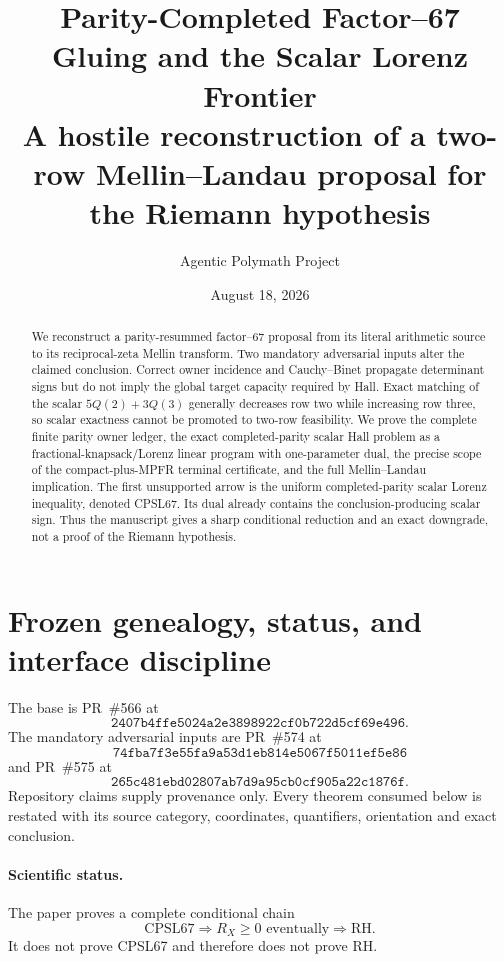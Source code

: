 \documentclass[11pt]{article}
\title{Parity-Completed Factor--67 Gluing and the Scalar Lorenz Frontier\\\large A hostile reconstruction of a two-row Mellin--Landau proposal for the Riemann hypothesis}
\author{Agentic Polymath Project}
\date{August 18, 2026}
\newcommand{\1}{\mathbf 1}
\begin{document}
\maketitle

\begin{abstract}
We reconstruct a parity-resummed factor--67 proposal from its literal arithmetic source to its reciprocal-zeta Mellin transform. Two mandatory adversarial inputs alter the claimed conclusion. Correct owner incidence and Cauchy--Binet propagate determinant signs but do not imply the global target capacity required by Hall. Exact matching of the scalar $5Q(2)+3Q(3)$ generally decreases row two while increasing row three, so scalar exactness cannot be promoted to two-row feasibility. We prove the complete finite parity owner ledger, the exact completed-parity scalar Hall problem as a fractional-knapsack/Lorenz linear program with one-parameter dual, the precise scope of the compact-plus-MPFR terminal certificate, and the full Mellin--Landau implication. The first unsupported arrow is the uniform completed-parity scalar Lorenz inequality, denoted \textup{CPSL67}. Its dual already contains the conclusion-producing scalar sign. Thus the manuscript gives a sharp conditional reduction and an exact downgrade, not a proof of the Riemann hypothesis.
\end{abstract}

\tableofcontents

\section{Frozen genealogy, status, and interface discipline}

The base is PR~\#566 at
\[
\texttt{2407b4ffe5024a2e3898922cf0b722d5cf69e496}.
\]
The mandatory adversarial inputs are PR~\#574 at
\[
\texttt{74fba7f3e55fa9a53d1eb814e5067f5011ef5e86}
\]
and PR~\#575 at
\[
\texttt{265c481ebd02807ab7d9a95cb0cf905a22c1876f}.
\]
Repository claims supply provenance only. Every theorem consumed below is restated with its source category, coordinates, quantifiers, orientation and exact conclusion.

\paragraph{Scientific status.}
The paper proves a complete conditional chain
\[
\mathrm{CPSL67}\Longrightarrow R_X\ge0\text{ eventually}\Longrightarrow\mathrm{RH}.
\]
It does not prove CPSL67 and therefore does not prove RH.
\end{document}
